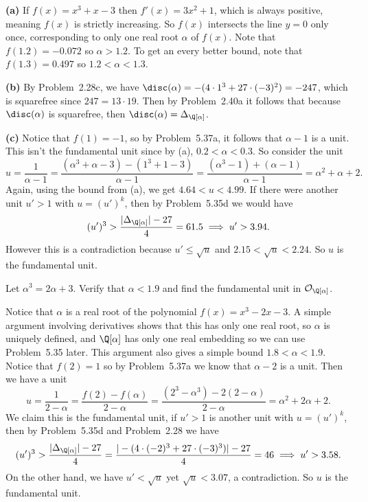 \documentclass[11pt,letterpaper]{article}
\begin{document}
\begin{solution}
    \textbf{(a)} If $f(x)=x^3+x-3$ then $f'(x)=3x^2+1$, which is always positive, meaning $f(x)$ is strictly increasing. So $f(x)$ intersects the line $y=0$ only once, corresponding to only one real root $\alpha$ of $f(x)$. Note that $f(1.2)=-0.072$ so $\alpha>1.2$. To get an every better bound, note that $f(1.3)=0.497$ so $1.2<\alpha<1.3$.
    
    \textbf{(b)} By Problem~2.28c, we have $\disc(\alpha)=-(4\cdot 1^3+27\cdot(-3)^2)=-247$, which is squarefree since $247=13\cdot 19$. Then by Problem~2.40a it follows that because $\disc(\alpha)$ is squarefree, then $\disc(\alpha)=\Delta_{\Q[\alpha]}$.  
    
    \textbf{(c)} Notice that $f(1)=-1$, so by Problem~5.37a, it follows that $\alpha-1$ is a unit. This isn't the fundamental unit since by (a), $0.2<\alpha<0.3$. So consider the unit
    \[
        u=\frac{1}{\alpha-1} = \frac{(\alpha^3+\alpha-3)-(1^3+1-3)}{\alpha-1} = \frac{(\alpha^3-1)+(\alpha-1)}{\alpha-1} = \boxed{\alpha^2+\alpha+2}
    .\]
    Again, using the bound from (a), we get $4.64 < u < 4.99$. If there were another unit $u'>1$ with $u=(u')^k$, then by Problem~5.35d we would have
    \[
        (u')^3>\frac{|\Delta_{\Q[\alpha]}| - 27}{4}=61.5\implies u' > 3.94
    .\] 
    However this is a contradiction because $u'\leq \sqrt{u}$ and $2.15 < \sqrt{u}<2.24$. So $u$ is the fundamental unit.
\end{solution}

\begin{cproblem}{5.39}
    Let $\alpha^3=2\alpha+3$. Verify that $\alpha<1.9$ and find the fundamental unit in $\mathcal{O}_{\Q[\alpha]}$.
\end{cproblem}

\begin{solution}
    Notice that $\alpha$ is a real root of the polynomial $f(x)=x^3-2x-3$. A simple argument involving derivatives shows that this has only one real root, so $\alpha$ is uniquely defined, and $\Q[\alpha]$ has only one real embedding so we can use Problem~5.35 later. This argument also gives a simple bound $1.8<\alpha<1.9$. Notice that $f(2)=1$ so by Problem~5.37a we know that $\alpha-2$ is a unit. Then we have a unit 
    \[
        u = \frac{1}{2-\alpha}=\frac{f(2)-f(\alpha)}{2-\alpha}=\frac{(2^3-\alpha^3)-2(2-\alpha)}{2-\alpha} =\boxed{\alpha^2+2\alpha+2}
    .\] 
    We claim this is the fundamental unit, if $u'>1$ is another unit with $u=(u')^k$, then by Problem~5.35d and Problem~2.28 we have
    \[
        (u')^3>\frac{|\Delta_{\Q[\alpha]}| - 27}{4} = \frac{|-(4\cdot (-2)^3 + 27\cdot (-3)^3)| - 27}{4} = 46\implies u'>3.58
    .\]  
    On the other hand, we have $u'<\sqrt{u}$ yet $\sqrt{u}< 3.07$, a contradiction. So $u$ is the fundamental unit.
\end{solution}
\end{document}

